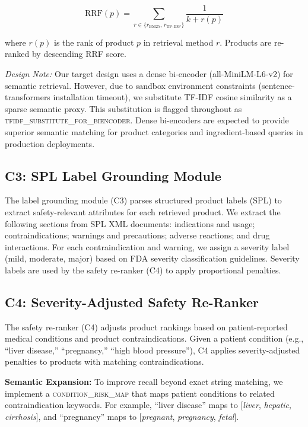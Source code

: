 \documentclass[conference]{IEEEtran}
\begin{document}
\begin{equation}
  \mathrm{RRF}(p)
    = \sum_{r \in \{r_{\mathrm{BM25}},\, r_{\mathrm{TF\text{-}IDF}}\}}
        \frac{1}{k + r(p)}
  \label{eq:rrf}
\end{equation}

\noindent where $r(p)$ is the rank of product $p$ in retrieval method $r$.
Products are re-ranked by descending RRF score.

\textit{Design Note:} Our target design uses a dense bi-encoder
(all-MiniLM-L6-v2) for semantic retrieval. However, due to sandbox environment
constraints (sentence-transformers installation timeout), we substitute TF-IDF
cosine similarity as a sparse semantic proxy. This substitution is flagged
throughout as \textsc{tfidf\_substitute\_for\_biencoder}. Dense bi-encoders are
expected to provide superior semantic matching for product categories and
ingredient-based queries in production deployments.

\subsection{C3: SPL Label Grounding Module}

The label grounding module (C3) parses structured product labels (SPL) to
extract safety-relevant attributes for each retrieved product. We extract the
following sections from SPL XML documents: indications and usage;
contraindications; warnings and precautions; adverse reactions; and drug
interactions. For each contraindication and warning, we assign a severity label
(mild, moderate, major) based on FDA severity classification guidelines.
Severity labels are used by the safety re-ranker (C4) to apply proportional
penalties.

\subsection{C4: Severity-Adjusted Safety Re-Ranker}

The safety re-ranker (C4) adjusts product rankings based on patient-reported
medical conditions and product contraindications. Given a patient condition
(e.g., ``liver disease,'' ``pregnancy,'' ``high blood pressure''), C4 applies
severity-adjusted penalties to products with matching contraindications.

\textbf{Semantic Expansion:} To improve recall beyond exact string matching, we
implement a \textsc{condition\_risk\_map} that maps patient conditions to related
contraindication keywords. For example, ``liver disease'' maps to
[\textit{liver}, \textit{hepatic}, \textit{cirrhosis}], and ``pregnancy'' maps
to [\textit{pregnant}, \textit{pregnancy}, \textit{fetal}].
\end{document}
